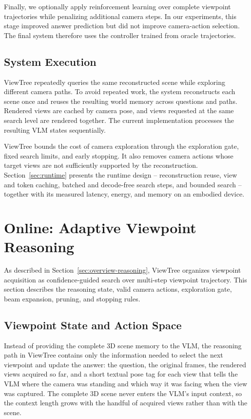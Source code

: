 \documentclass[sigconf,10pt]{acmart}
\newcommand{\system}{ViewTree\xspace}
\begin{document}
	Finally, we optionally apply reinforcement learning over complete viewpoint trajectories while penalizing additional camera steps. In our experiments, this stage improved answer prediction but did not improve camera-action selection. The final system therefore uses the controller trained from oracle trajectories.
	
	\subsection{System Execution}
	\label{sec:overview-runtime}
	ViewTree repeatedly queries the same reconstructed scene while exploring different camera paths. To avoid repeated work, the system reconstructs each scene once and reuses the resulting world memory across questions and paths. Rendered views are cached by camera pose, and views requested at the same search level are rendered together. The current implementation processes the resulting VLM states sequentially.
	
	ViewTree bounds the cost of camera exploration through the exploration gate, fixed search limits, and early stopping. It also removes camera actions whose target views are not sufficiently supported by the reconstruction. Section~\ref{sec:runtime} presents the runtime design -- reconstruction reuse, view and token caching, batched and decode-free search steps, and bounded search -- together with its measured latency, energy, and memory on an embodied device.
	
	\section{Online: Adaptive Viewpoint Reasoning}
	\label{sec:reasoning}
	As described in Section~\ref{sec:overview-reasoning}, \system organizes viewpoint acquisition as confidence-guided search over multi-step viewpoint trajectory. This section describes the reasoning state, valid camera actions, exploration gate, beam expansion, pruning, and stopping rules.
	
	\subsection{Viewpoint State and Action Space}
	
	Instead of providing the complete 3D scene memory to the VLM, the reasoning path in \system contains only the information needed to select the next viewpoint and update the answer: the question, the original frames, the rendered views acquired so far, and a short textual pose tag for each view that tells the VLM where the camera was standing and which way it was facing when the view was captured. The complete 3D scene never enters the VLM's input context, so the context length grows with the handful of acquired views rather than with the scene.
\end{document}
